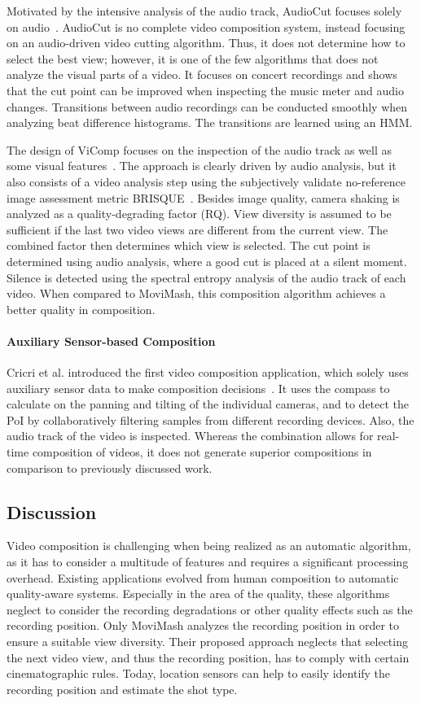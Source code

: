 Motivated by the intensive analysis of the audio track, AudioCut focuses solely on audio~\cite{Roininen2016}.
AudioCut is no complete video composition system, instead focusing on an audio-driven video cutting algorithm.
Thus, it does not determine how to select the best view; however, it is one of the few algorithms that does not analyze the visual parts of a video.
It focuses on concert recordings and shows that the cut point can be improved when inspecting the music meter and audio changes.
Transitions between audio recordings can be conducted smoothly when analyzing beat difference histograms.
The transitions are learned using an \ac{HMM}.

The design of ViComp focuses on the inspection of the audio track as well as some visual features~\cite{Bano2015b}.
The approach is clearly driven by audio analysis, but it also consists of a video analysis step using the subjectively validate no-reference image assessment metric \ac{BRISQUE}~\cite{Mittal2011}.
Besides image quality, camera shaking is analyzed as a quality-degrading factor (RQ).
View diversity is assumed to be sufficient if the last two video views are different from the current view.
The combined factor then determines which view is selected.
The cut point is determined using audio analysis, where a good cut is placed at a silent moment.
Silence is detected using the spectral entropy analysis of the audio track of each video.
When compared to MoviMash, this composition algorithm achieves a better quality in composition.	
\paragraph{Auxiliary Sensor-based Composition}
Cricri et al. introduced the first video composition application, which solely uses auxiliary sensor data to make composition decisions~\cite{Cricri2012}.
It uses the compass to calculate on the panning and tilting of the individual cameras, and to detect the \ac{PoI} by collaboratively filtering samples from different recording devices.
Also, the audio track of the video is inspected.
Whereas the combination allows for real-time composition of videos, it does not generate superior compositions in comparison to previously discussed work.
\subsection{Discussion}
Video composition is challenging when being realized as an automatic algorithm, as it has to consider a multitude of features and requires a significant processing overhead.
Existing applications evolved from human composition to automatic quality-aware systems.
Especially in the area of the quality, these algorithms neglect to consider the recording degradations or other quality effects such as the recording position.
Only MoviMash analyzes the recording position in order to ensure a suitable view diversity.
Their proposed approach neglects that selecting the next video view, and thus the recording position, has to comply with certain cinematographic rules.
Today, location sensors can help to easily identify the recording position and estimate the shot type.

